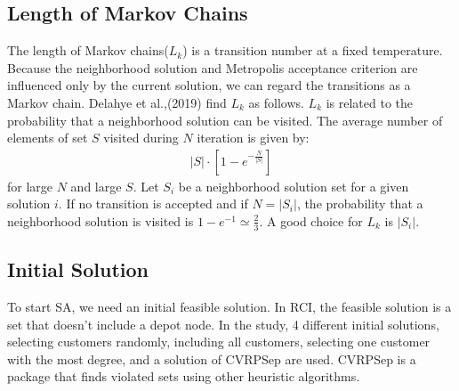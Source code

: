 \documentclass[11pt]{article}
\begin{document}
\begin{spacing}{1.5}
{\centering\subsection{Length of Markov Chains}}
The length of Markov chains($L_k$) is a transition number at a fixed temperature. Because the neighborhood solution and Metropolis acceptance criterion are influenced only by the current solution, we can regard the transitions as a Markov chain. Delahye et al.,(2019) find $L_k$ as follows\cite{SA}. $L_k$ is related to the probability that a neighborhood solution can be visited. The average number of elements of set $S$ visited during $N$ iteration is given by:
\begin{align}
    |S|\cdot[1-e^{-\frac{N}{|S|}}]
\end{align}
for large $N$ and large $S$. Let $S_i$ be a neighborhood solution set for a given solution $i$. If no transition is accepted and if $N=|S_i|$, the probability that a neighborhood solution is visited is $1-e^{-1} \simeq \frac{2}{3}$. A good choice for $L_k$ is $|S_i|$.


{\centering\subsection{Initial Solution}}
To start SA, we need an initial feasible solution. In RCI, the feasible solution is a set that doesn't include a depot node. In the study, 4 different initial solutions, selecting customers randomly, including all customers, selecting one customer with the most degree, and a solution of CVRPSep are used. CVRPSep is a package that finds violated sets using other heuristic algorithms. 



\end{spacing}
\end{document}

